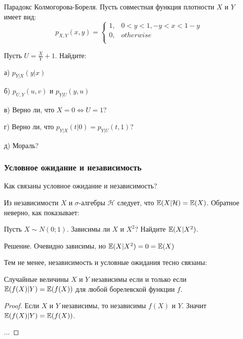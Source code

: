 {\begin{myex} Парадокс Колмогорова-Бореля.
Пусть совместная функция плотности $X$ и $Y$ имеет вид:
\begin{equation}
p_{X,Y}(x,y)=\left\{
\begin{array}{ll}
  1, & 0<y<1, -y<x<1-y \\
  0, & otherwise \\
\end{array}
\right.
\end{equation}

Пусть $U=\frac{X}{Y}+1$. Найдите:

а) $p_{Y|X}(y|x)$

б) $p_{U,Y}(u,v)$ и $p_{Y|U}(y,u)$

в) Верно ли, что $X=0 \Leftrightarrow U=1$?

г) Верно ли, что $p_{Y|X}(t|0)=p_{Y|U}(t,1)$?

д) Мораль?

\end{myex}







\subsubsection*{Условное ожидание и независимость}

Как связаны условное ожидание и независимость?

Из независимости $ X $ и $ \sigma $-алгебры $ \mathcal{H} $ следует, что $ \mathbb{E}(X|\mathcal{H})=\mathbb{E}(X)$. Обратное неверно, как показывает:
\begin{myex}
Пусть $ X\sim N(0;1) $. Зависимы ли $ X $ и $ X^{2} $? Найдите $ \mathbb{E}(X|X^{2}) $.

Решение. Очевидно зависимы, но $ \mathbb{E}(X|X^{2})=0=\mathbb{E}(X) $
\end{myex}

Тем не менее, независимость и условные ожидания тесно связаны:
\begin{myth}
Случайные величины $ X $ и $ Y $ независимы если и только если $ \mathbb{E}(f(X)|Y)=\mathbb{E}(f(X))$ для любой борелевской функции $f$.
\end{myth}
\begin{proof}
Если $ X $ и $Y  $ независимы, то независимы $f(X)  $ и $ Y $. Значит $ \mathbb{E}(f(X)|Y)=\mathbb{E}(f(X))$.

...

\end{proof}

}
